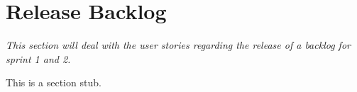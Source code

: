 \section{Release Backlog} \label{Sprint3_SecReleaseBacklog}
\textit{This section will deal with the user stories regarding the release of a backlog for sprint 1 and 2.}

This is a section stub.